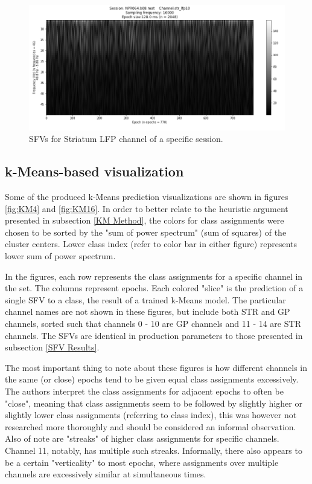 \documentclass{article}
\begin{document}
\begin{figure}[H]
    \centering
    \centerline{\includegraphics[width=1\textwidth]{images/STR2.png}}
    \caption{SFVs for Striatum LFP channel of a specific session.}
    \label{fig:STR2}
\end{figure}

\subsection{k-Means-based visualization}\label{KM Results}

Some of the produced k-Means prediction visualizations are shown in figures \ref{fig:KM4} and \ref{fig:KM16}.
In order to better relate to the heuristic argument presented in subsection \ref{KM Method}, the colors for class assignments were chosen to be sorted by the "sum of power spectrum" (sum of squares) of the cluster centers.
Lower class index (refer to color bar in either figure) represents lower sum of power spectrum.

In the figures, each row represents the class assignments for a specific channel in the set.
The columns represent epochs.
Each colored "slice" is the prediction of a single SFV to a class, the result of a trained k-Means model.
The particular channel names are not shown in these figures, but include both STR and GP channels, sorted such that channels 0 - 10 are GP channels and 11 - 14 are STR channels.
The SFVs are identical in production parameters to those presented in subsection \ref{SFV Results}.

The most important thing to note about these figures is how different channels in the same (or close) epochs tend to be given equal class assignments excessively. 
The authors interpret the class assignments for adjacent epochs to often be "close", meaning that class assignments seem to be followed by slightly higher or slightly lower class assignments (referring to class index), this was however not researched more thoroughly and should be considered an informal observation.
Also of note are "streaks" of higher class assignments for specific channels.
Channel 11, notably, has multiple such streaks.
Informally, there also appears to be a certain "verticality" to most epochs, where assignments over multiple channels are excessively similar at simultaneous times.
\end{document}

